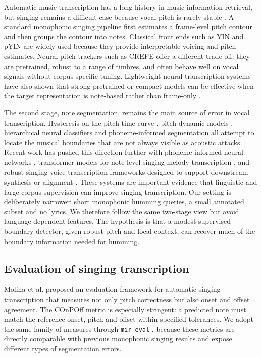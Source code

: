 \documentclass[pdflatex,sn-mathphys-num]{sn-jnl}
\begin{document}
Automatic music transcription has a long history in music information retrieval, but singing remains a difficult case because vocal pitch is rarely stable \cite{benetos2013amt,gomez2013flamenco}. A standard monophonic singing pipeline first estimates a frame-level pitch contour and then groups the contour into notes. Classical front ends such as YIN \cite{decheveigne2002yin} and pYIN \cite{mauch2014pyin} are widely used because they provide interpretable voicing and pitch estimates. Neural pitch trackers such as CREPE \cite{kim2018crepe} offer a different trade-off: they are pretrained, robust to a range of timbres, and often behave well on vocal signals without corpus-specific tuning. Lightweight neural transcription systems have also shown that strong pretrained or compact models can be effective when the target representation is note-based rather than frame-only \cite{bittner2022lightweight}.

The second stage, note segmentation, remains the main source of error in vocal transcription. Hysteresis on the pitch-time curve \cite{molina2015sipth}, pitch dynamic models \cite{yang2017probabilistic}, hierarchical neural classifiers \cite{fu2019hierarchical} and phoneme-informed segmentation \cite{li2021phoneme} all attempt to locate the musical boundaries that are not always visible as acoustic attacks. Recent work has pushed this direction further with phoneme-informed neural networks \cite{yong2023phoneme}, transformer models for note-level singing melody transcription \cite{park2023transformers}, and robust singing-voice transcription frameworks designed to support downstream synthesis or alignment \cite{li2024rosvot,guo2025stars,kim2025timealigned}. These systems are important evidence that linguistic and large-corpus supervision can improve singing transcription. Our setting is deliberately narrower: short monophonic humming queries, a small annotated subset and no lyrics. We therefore follow the same two-stage view but avoid language-dependent features. The hypothesis is that a modest supervised boundary detector, given robust pitch and local context, can recover much of the boundary information needed for humming.

\subsection{Evaluation of singing transcription}

Molina et al. \cite{molina2014evaluation} proposed an evaluation framework for automatic singing transcription that measures not only pitch correctness but also onset and offset agreement. The COnPOff metric is especially stringent: a predicted note must match the reference onset, pitch and offset within specified tolerances. We adopt the same family of measures through \texttt{mir\_eval} \cite{raffel2014mireval}, because these metrics are directly comparable with previous monophonic singing results and expose different types of segmentation errors.
\end{document}
